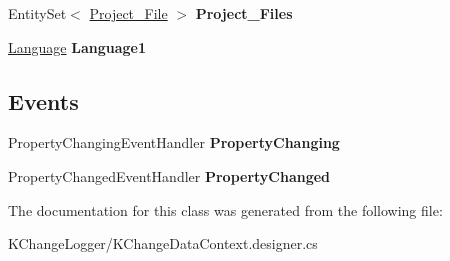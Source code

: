 \begin{DoxyCompactItemize}
\item 
\hypertarget{class_k_change_logger_1_1_project_a5619c331e360ef5e3b33f510cc1deaf1}{Entity\-Set$<$ \hyperlink{class_k_change_logger_1_1_project___file}{Project\-\_\-\-File} $>$ {\bfseries Project\-\_\-\-Files}}\label{class_k_change_logger_1_1_project_a5619c331e360ef5e3b33f510cc1deaf1}

\item 
\hypertarget{class_k_change_logger_1_1_project_aaefb1257443dae051cb8bf2c60825d00}{\hyperlink{class_k_change_logger_1_1_language}{Language} {\bfseries Language1}}\label{class_k_change_logger_1_1_project_aaefb1257443dae051cb8bf2c60825d00}

\end{DoxyCompactItemize}
\subsection*{Events}
\begin{DoxyCompactItemize}
\item 
\hypertarget{class_k_change_logger_1_1_project_a2fb5dc89215337f5771d9b03438b0e2b}{Property\-Changing\-Event\-Handler {\bfseries Property\-Changing}}\label{class_k_change_logger_1_1_project_a2fb5dc89215337f5771d9b03438b0e2b}

\item 
\hypertarget{class_k_change_logger_1_1_project_a77548e6a36a07adf1392b7746a0bd9f4}{Property\-Changed\-Event\-Handler {\bfseries Property\-Changed}}\label{class_k_change_logger_1_1_project_a77548e6a36a07adf1392b7746a0bd9f4}

\end{DoxyCompactItemize}


The documentation for this class was generated from the following file\-:\begin{DoxyCompactItemize}
\item 
K\-Change\-Logger/K\-Change\-Data\-Context.\-designer.\-cs\end{DoxyCompactItemize}
